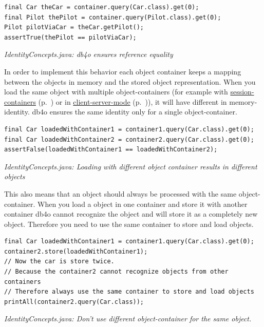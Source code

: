\begin{lstlisting}
final Car theCar = container.query(Car.class).get(0);
final Pilot thePilot = container.query(Pilot.class).get(0);
Pilot pilotViaCar = theCar.getPilot();
assertTrue(thePilot == pilotViaCar);
\end{lstlisting}

{\small\itshape IdentityConcepts.java: db4o ensures reference equality\par}
\medskip

In order to implement this behavior each object container keeps a mapping between the objects in memory and the stored object representation. When you load the same object with multiple object-containers (for example with \hyperref[ref:advanced-topics-session-containers]{session-containers} (p.~\pageref{ref:advanced-topics-session-containers}) or in \hyperref[ref:client-server]{client-server-mode} (p.~\pageref{ref:client-server})), it will have different in memory-identity. db4o ensures the same identity only for a single object-container.

\begin{lstlisting}
final Car loadedWithContainer1 = container1.query(Car.class).get(0);
final Car loadedWithContainer2 = container2.query(Car.class).get(0);
assertFalse(loadedWithContainer1 == loadedWithContainer2);
\end{lstlisting}

{\small\itshape IdentityConcepts.java: Loading with different object container results in different objects\par}
\medskip

This also means that an object should always be processed with the same object-container. When you load a object in one container and store it with another container db4o cannot recognize the object and will store it as a completely new object. Therefore you need to use the same container to store and load objects.

\begin{lstlisting}
final Car loadedWithContainer1 = container1.query(Car.class).get(0);
container2.store(loadedWithContainer1);
// Now the car is store twice.
// Because the container2 cannot recognize objects from other containers
// Therefore always use the same container to store and load objects
printAll(container2.query(Car.class));
\end{lstlisting}

{\small\itshape IdentityConcepts.java: Don't use different object-container for the same object.\par}
\medskip

